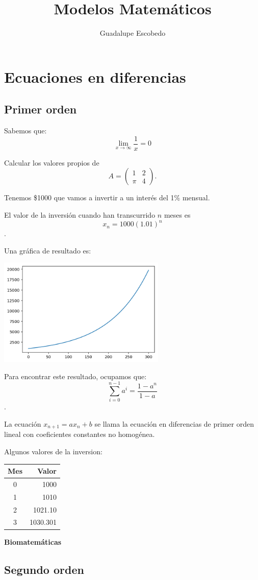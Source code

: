 \documentclass{article}
\title{Modelos Matemáticos}
\author{Guadalupe Escobedo}
\begin{document}
\maketitle
\section{Ecuaciones en diferencias}
\subsection{Primer orden}
Sabemos que: $$\lim_{x\to\infty}\frac{1}{x}=0$$

Calcular los valores propios de $$A=
\begin{pmatrix}
1 & 2\\
\pi & 4

\end{pmatrix}.
$$

Tenemos \$1000 que vamos a invertir a un interés del 1\% mensual.

El valor de la inversión cuando han transcurrido $n$ meses es $$x_n=1000(1.01)^n$$.

Una gráfica de resultado es:

\begin{center}
\includegraphics[width=8cm]{grafica}
\end{center}

Para encontrar este resultado, ocupamos que:
$$\sum_{i=0}^{n-1}a^i=\frac{1-a^{n}}{1-a}$$.

La ecuación $x_{n+1}=ax_n+b$ se llama la ecuación en diferencias de primer orden lineal con coeficientes constantes no homogénea.

Algunos valores de la inversion:
\begin{center}
\begin{tabular}{|c|r|}

\hline
Mes & Valor\\ 
\hline
0 & 1000 \\
1 & 1010 \\
2 & 1021.10 \\
3 & 1030.301 \\
\hline
\end{tabular}
\end{center}


\begin{center}
\huge
\textbf{Biomatemáticas}
\end{center}

\subsection{Segundo orden}
\end{document}
